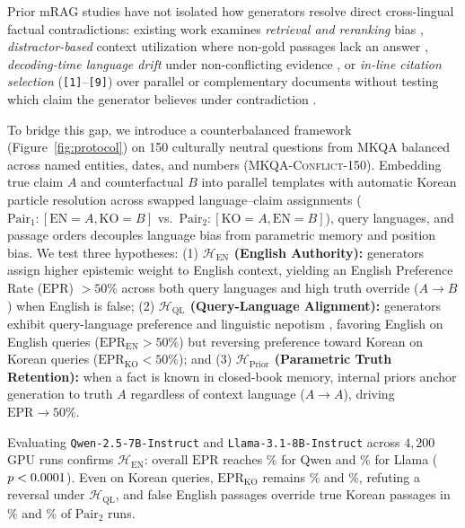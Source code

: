 Prior mRAG studies have not isolated how generators resolve direct cross-lingual factual contradictions: existing work examines \emph{retrieval and reranking} bias \citep{park2025investigating,wang2026languages}, \emph{distractor-based} context utilization where non-gold passages lack an answer \citep{qi2025consistency}, \emph{decoding-time language drift} under non-conflicting evidence \citep{li2025language}, or \emph{in-line citation selection} (\texttt{[1]}--\texttt{[9]}) over parallel or complementary documents without testing which claim the generator believes under contradiction \citep{ki2025linguistic}.

To bridge this gap, we introduce a counterbalanced framework (Figure~\ref{fig:protocol}) on 150 culturally neutral questions from MKQA \citep{longpre2021mkqa} balanced across named entities, dates, and numbers (\textsc{MKQA-Conflict-150}). Embedding true claim $A$ and counterfactual $B$ into parallel templates with automatic Korean particle resolution across swapped language--claim assignments ($\text{Pair}_1: [\text{EN}{=}A, \text{KO}{=}B]$ vs.\ $\text{Pair}_2: [\text{KO}{=}A, \text{EN}{=}B]$), query languages, and passage orders decouples language bias from parametric memory and position bias. We test three hypotheses: (1) \textbf{$\mathcal{H}_{\text{EN}}$ (English Authority):} generators assign higher epistemic weight to English context, yielding an English Preference Rate ($\text{EPR}$) $> 50\%$ across both query languages and high truth override ($A \to B$) when English is false; (2) \textbf{$\mathcal{H}_{\text{QL}}$ (Query-Language Alignment):} generators exhibit query-language preference and linguistic nepotism \citep{ki2025linguistic,park2025investigating,sharma2025faux}, favoring English on English queries ($\text{EPR}_{\text{EN}} > 50\%$) but reversing preference toward Korean on Korean queries ($\text{EPR}_{\text{KO}} < 50\%$); and (3) \textbf{$\mathcal{H}_{\text{Prior}}$ (Parametric Truth Retention):} when a fact is known in closed-book memory, internal priors anchor generation to truth $A$ regardless of context language ($A \to A$), driving $\text{EPR} \to 50\%$.

Evaluating \texttt{Qwen-2.5-7B-Instruct} \citep{yang2024qwen25} and \texttt{Llama-3.1-8B-Instruct} \citep{grattafiori2024llama3} across $4{,}200$ GPU runs confirms $\mathcal{H}_{\text{EN}}$: overall $\text{EPR}$ reaches \qwenEPRAll\% for Qwen and \llamaEPRAll\% for Llama ($p <0.0001$). Even on Korean queries, $\text{EPR}_{\text{KO}}$ remains \qwenEPRKO\% and \llamaEPRKO\%, refuting a reversal under $\mathcal{H}_{\text{QL}}$, and false English passages override true Korean passages in \qwenPairTwoOverrideAll\% and \llamaPairTwoOverrideAll\% of $\text{Pair}_2$ runs.
